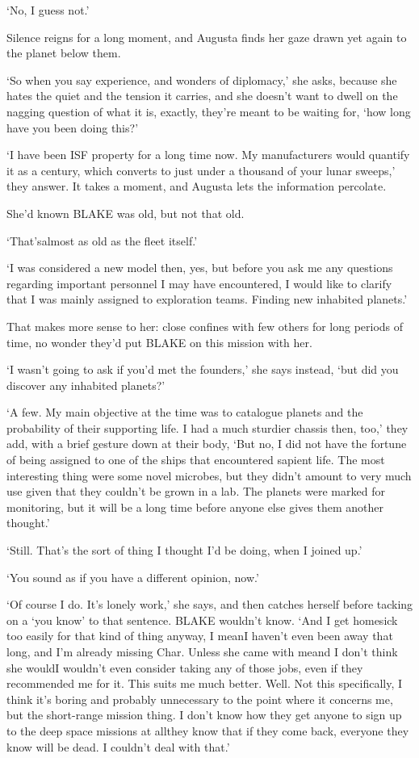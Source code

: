`No, I guess not.'

Silence reigns for a long moment, and Augusta finds her gaze drawn yet
again to the planet below them.

`So when you say experience, and wonders of diplomacy,' she asks,
because she hates the quiet and the tension it carries, and she
doesn't want to dwell on the nagging question of what it is, exactly,
they're meant to be waiting for, `how long have you been doing this?'

`I have been ISF property for a long time now. My manufacturers would
quantify it as a century, which converts to just under a thousand of
your lunar sweeps,' they answer. It takes a moment, and Augusta lets
the information percolate.

She'd known BLAKE was old, but not that old.

`That's\textellipsis almost as old as the fleet itself.'

`I was considered a new model then, yes, but before you ask me any
questions regarding important personnel I may have encountered, I
would like to clarify that I was mainly assigned to exploration
teams. Finding new inhabited planets.'

That makes more sense to her: close confines with few others for long
periods of time, no wonder they'd put BLAKE on this mission with her.

`I wasn't going to ask if you'd met the founders,' she says instead,
`but did you discover any inhabited planets?'

`A few. My main objective at the time was to catalogue planets and the
probability of their supporting life. I had a much sturdier chassis
then, too,' they add, with a brief gesture down at their body, `But
no, I did not have the fortune of being assigned to one of the ships
that encountered sapient life. The most interesting thing were some
novel microbes, but they didn't amount to very much use given that
they couldn't be grown in a lab. The planets were marked for
monitoring, but it will be a long time before anyone else gives them
another thought.'

`Still. That's the sort of thing I thought I'd be doing, when I joined
up.'

`You sound as if you have a different opinion, now.'

`Of course I do. It's lonely work,' she says, and then catches herself
before tacking on a `you know' to that sentence. BLAKE wouldn't
know. `And I get homesick too easily for that kind of thing anyway, I
mean\textemdash I haven't even been away that long, and I'm already
missing Char. Unless she came with me\textemdash and I don't think
she would\textemdash I wouldn't even consider taking any of those
jobs, even if they recommended me for it. This suits me much
better. Well. Not this specifically, I think it's boring and probably
unnecessary to the point where it concerns me, but the short-range
mission thing. I don't know how they get anyone to sign up to the deep
space missions at all\textellipsis they know that if they come back,
everyone they know will be dead. I couldn't deal with that.'



